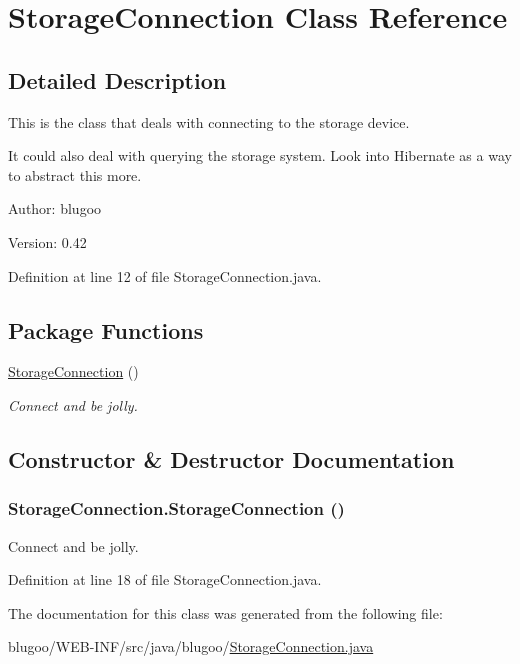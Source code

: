 \hypertarget{classStorageConnection}{
\section{StorageConnection Class Reference}
\label{classStorageConnection}
}


\subsection{Detailed Description}
This is the class that deals with connecting to the storage device. 

It could also deal with querying the storage system. Look into Hibernate as a way to abstract this more.

\begin{Desc}
\item[Author:]blugoo \end{Desc}
\begin{Desc}
\item[Version:]0.42 \end{Desc}


Definition at line 12 of file StorageConnection.java.\subsection*{Package Functions}
\begin{CompactItemize}
\item 
\hyperlink{classStorageConnection_70a296b82c454528c1b86fa071076fb4}{StorageConnection} ()
\begin{CompactList}\small\item\em Connect and be jolly. \item\end{CompactList}\end{CompactItemize}


\subsection{Constructor \& Destructor Documentation}
\hypertarget{classStorageConnection_70a296b82c454528c1b86fa071076fb4}{
\subsubsection{\setlength{\rightskip}{0pt plus 5cm}StorageConnection.StorageConnection ()}}
\label{classStorageConnection_70a296b82c454528c1b86fa071076fb4}


Connect and be jolly. 



Definition at line 18 of file StorageConnection.java.

The documentation for this class was generated from the following file:\begin{CompactItemize}
\item 
blugoo/WEB-INF/src/java/blugoo/\hyperlink{StorageConnection_8java}{StorageConnection.java}\end{CompactItemize}
